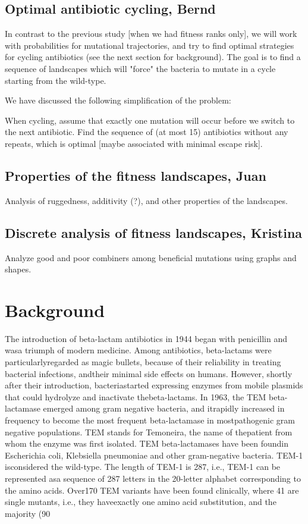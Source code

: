 \documentclass[12pt]{amsart}
\theoremstyle{plain}
\theoremstyle{definition}
\begin{document}
\subsection{Optimal antibiotic cycling, Bernd}
In contrast to the previous study [when we had
fitness ranks only], 
we will work with probabilities for
mutational trajectories, and 
try to find optimal strategies for 
cycling antibiotics (see the next section 
for background).
The goal is to find a  sequence of landscapes
which will "force" the bacteria to mutate in a cycle
starting from the wild-type. 

We have discussed the following simplification of the problem:
 
When cycling, assume that exactly one mutation will occur before we
switch to the next antibiotic.
Find the sequence of (at most 15) antibiotics without any repeats,
which is optimal [maybe associated with minimal
escape risk].

\subsection{Properties of the fitness landscapes, Juan}
Analysis of ruggedness, additivity (?), 
and other properties of the landscapes.

\subsection{Discrete analysis of fitness landscapes, Kristina}
Analyze good and poor combiners among beneficial 
mutations using graphs and shapes.

\section{Background}
The introduction of beta-lactam antibiotics in 1944 began with penicillin and wasa triumph of modern medicine.   Among antibiotics,   beta-lactams were particularlyregarded as magic bullets, because of their reliability in treating bacterial infections, andtheir minimal side effects on humans.  However, shortly after their introduction, bacteriastarted expressing enzymes from mobile plasmids that could hydrolyze and inactivate thebeta-lactams. In 1963, the TEM beta-lactamase emerged among gram negative bacteria, and itrapidly increased in frequency to become the most frequent beta-lactamase in mostpathogenic gram negative populations.   TEM stands for Temoneira, the name of thepatient from whom the enzyme was first isolated. TEM beta-lactamases have been foundin Escherichia coli, Klebsiella pneumoniae and other gram-negative bacteria. TEM-1 isconsidered the wild-type. The length of TEM-1 is 287, i.e., TEM-1 can be represented asa sequence of 287 letters in the 20-letter alphabet corresponding to the amino acids. Over170 TEM variants have been found clinically, where 41 are single mutants, i.e., they haveexactly one amino acid substitution, and the majority (90 %
\end{document}
